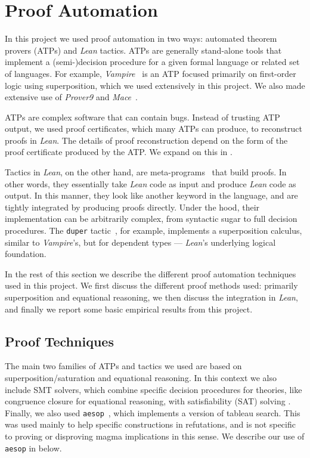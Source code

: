 \section{Proof Automation}\label{automated-sec}

In this project we used proof automation in two ways: automated theorem provers (ATPs) and \emph{Lean} tactics.
ATPs are generally stand-alone tools that implement a (semi-)decision procedure for a given formal language or related set of languages.
For example, \emph{Vampire}~\cite{DBLP:conf/cav/KovacsV13} is an ATP focused primarily on first-order logic using superposition, which we used extensively in this project.  We also made extensive use of \emph{Prover9} and \emph{Mace}~\cite{prover9-mace4}.

ATPs are complex software that can contain bugs.
Instead of trusting ATP output, we used proof certificates, which many ATPs can produce, to reconstruct proofs in \emph{Lean}.
The details of proof reconstruction depend on the form of the proof certificate produced by the ATP.
We expand on this in .

Tactics in \emph{Lean}, on the other hand, are meta-programs~\cite{DBLP:journals/pacmpl/EbnerURAM17} that build proofs.
In other words, they essentially take \emph{Lean} code as input and produce \emph{Lean} code as output.
In this manner, they look like another keyword in the language, and are tightly integrated by producing proofs directly.
Under the hood, their implementation can be arbitrarily complex, from syntactic sugar to full decision procedures.
The \texttt{duper} tactic~\cite{DBLP:conf/itp/CluneQBA24}, for example, implements a superposition calculus, similar to \emph{Vampire}'s, but for dependent types --- \emph{Lean}'s underlying logical foundation.

In the rest of this section we describe the different proof automation techniques used in this project.
We first discuss the different proof methods used: primarily superposition and equational reasoning, we then discuss the integration in \emph{Lean}, and finally we report some basic empirical results from this project.

\subsection{Proof Techniques}

The main two families of ATPs and tactics we used are based on superposition/saturation and equational reasoning.
In this context we also include SMT solvers, which combine specific decision procedures for theories, like congruence closure for equational reasoning, with satisfiability (SAT) solving \cite{deMoura-Bjorner-2009}.
Finally, we also used \texttt{aesop}~\cite{DBLP:conf/cpp/LimpergF23}, which implements a version of tableau search.
This was used mainly to help specific constructions in refutations, and is not specific to proving or disproving magma implications in this sense.
We describe our use of \texttt{aesop} in  below.

